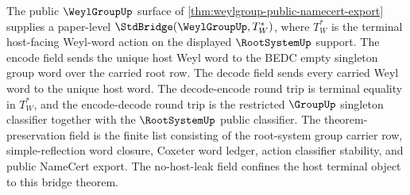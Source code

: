 \begin{theorem}
\label{thm:weylgroup-root-system-terminal-standard-bridge}
The public $\WeylGroupUp$ surface of
\autoref{thm:weylgroup-public-namecert-export} supplies a paper-level
$\StdBridge(\WeylGroupUp,T_W^\ast)$, where $T_W^\ast$ is the terminal
host-facing Weyl-word action on the displayed $\RootSystemUp$ support.
The encode field sends the unique host Weyl word to the BEDC empty singleton
group word over the carried root row. The decode field sends every carried
Weyl word to the unique host word. The decode-encode round trip is terminal
equality in $T_W^\ast$, and the encode-decode round trip is the restricted
$\GroupUp$ singleton classifier together with the $\RootSystemUp$ public
classifier. The theorem-preservation field is the finite list consisting of
the root-system group carrier row, simple-reflection word closure, Coxeter word
ledger, action classifier stability, and public NameCert export. The
no-host-leak field confines the host terminal object to this bridge theorem.
\end{theorem}
